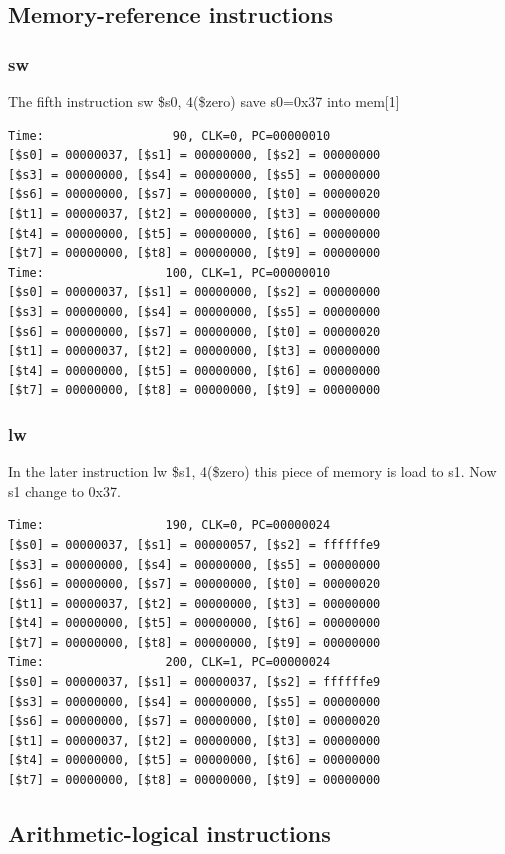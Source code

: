 \documentclass[a4paper,12pt]{article}
\begin{document}
\subsection{Memory-reference instructions}
\subsubsection{sw}
\par The fifth instruction sw \$s0, 4(\$zero) save s0=0x37 into mem[1]
\begin{lstlisting}
Time:                  90, CLK=0, PC=00000010
[$s0] = 00000037, [$s1] = 00000000, [$s2] = 00000000
[$s3] = 00000000, [$s4] = 00000000, [$s5] = 00000000
[$s6] = 00000000, [$s7] = 00000000, [$t0] = 00000020
[$t1] = 00000037, [$t2] = 00000000, [$t3] = 00000000
[$t4] = 00000000, [$t5] = 00000000, [$t6] = 00000000
[$t7] = 00000000, [$t8] = 00000000, [$t9] = 00000000
Time:                 100, CLK=1, PC=00000010
[$s0] = 00000037, [$s1] = 00000000, [$s2] = 00000000
[$s3] = 00000000, [$s4] = 00000000, [$s5] = 00000000
[$s6] = 00000000, [$s7] = 00000000, [$t0] = 00000020
[$t1] = 00000037, [$t2] = 00000000, [$t3] = 00000000
[$t4] = 00000000, [$t5] = 00000000, [$t6] = 00000000
[$t7] = 00000000, [$t8] = 00000000, [$t9] = 00000000
\end{lstlisting}

\subsubsection{lw}
In the later instruction lw \$s1, 4(\$zero) this piece of memory is load to s1. Now s1 change to 0x37.
\begin{lstlisting}
Time:                 190, CLK=0, PC=00000024
[$s0] = 00000037, [$s1] = 00000057, [$s2] = ffffffe9
[$s3] = 00000000, [$s4] = 00000000, [$s5] = 00000000
[$s6] = 00000000, [$s7] = 00000000, [$t0] = 00000020
[$t1] = 00000037, [$t2] = 00000000, [$t3] = 00000000
[$t4] = 00000000, [$t5] = 00000000, [$t6] = 00000000
[$t7] = 00000000, [$t8] = 00000000, [$t9] = 00000000
Time:                 200, CLK=1, PC=00000024
[$s0] = 00000037, [$s1] = 00000037, [$s2] = ffffffe9
[$s3] = 00000000, [$s4] = 00000000, [$s5] = 00000000
[$s6] = 00000000, [$s7] = 00000000, [$t0] = 00000020
[$t1] = 00000037, [$t2] = 00000000, [$t3] = 00000000
[$t4] = 00000000, [$t5] = 00000000, [$t6] = 00000000
[$t7] = 00000000, [$t8] = 00000000, [$t9] = 00000000
\end{lstlisting}


\subsection{Arithmetic-logical instructions}
\end{document}
